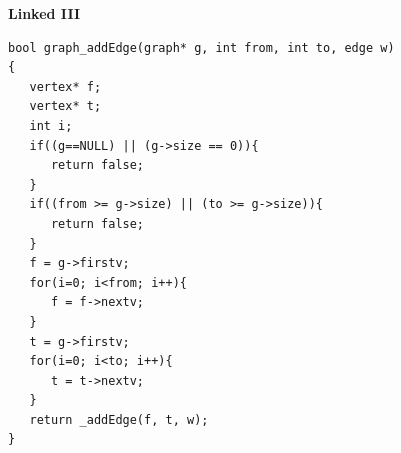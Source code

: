 \newpage
{\samepage
\begin{center}
{\Large{\bf Linked III}}
\end{center}
{\small
\begin{verbatim}
bool graph_addEdge(graph* g, int from, int to, edge w)
{
   vertex* f;
   vertex* t;
   int i;
   if((g==NULL) || (g->size == 0)){
      return false;
   }
   if((from >= g->size) || (to >= g->size)){
      return false;
   }
   f = g->firstv;
   for(i=0; i<from; i++){
      f = f->nextv;
   }
   t = g->firstv;
   for(i=0; i<to; i++){
      t = t->nextv;
   }
   return _addEdge(f, t, w);
}
\end{verbatim}
}}
